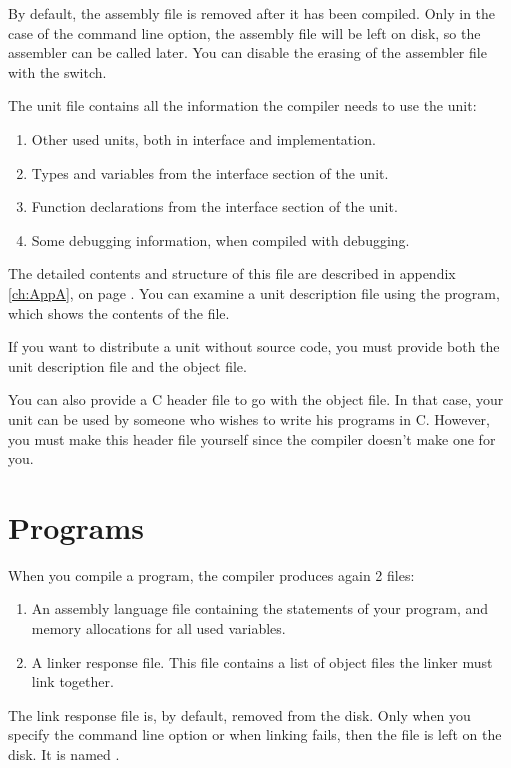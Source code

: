 By default, the assembly file is removed after it has been compiled.
Only in the case of the  command line option, the assembly file
will be left on disk, so the assembler can be called later. You can
disable the erasing of the assembler file with the  switch.

The unit file contains all the information the compiler needs to use the
unit:
\begin{enumerate}
\item Other used units, both in interface and implementation.
\item Types and variables from the interface section of the unit.
\item Function declarations from the interface section of the unit.
\item Some debugging information, when compiled with debugging.
\end{enumerate}

The detailed contents and structure of this file are described in appendix
\ref{ch:AppA}, on page \pageref{ch:AppA}.
You can examine a unit description file using the 
program, which shows the contents of the file.

If you want to distribute a unit without source code, you must provide both
the unit description file and the object file.

You can also provide a C header file to go with the object file. In that
case, your unit can be used by someone who wishes to write his programs in
C. However, you must make this header file yourself since the \fpc compiler
doesn't make one for you.

\section{Programs}
\label{se:Programs}

When you compile a program, the compiler produces again 2 files:
\begin{enumerate}
\item An assembly language file containing the statements of your program,
and memory allocations for all used variables.
\item A linker response file. This file contains a list of object files the
linker must link together.
\end{enumerate}
The link response file is, by default, removed from the disk. Only when you
specify the  command line option or when linking fails, then the file
is left on the disk. It is named .

